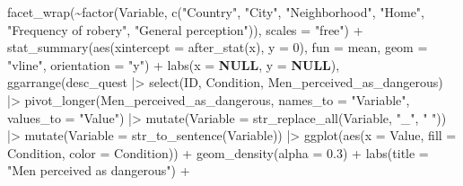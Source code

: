 \documentclass[
  bookmarksnumbered]{article}
\newenvironment{Shaded}{\begin{snugshade}}{\end{snugshade}}
\newcommand{\AttributeTok}[1]{\textcolor[rgb]{0.80,0.80,0.80}{#1}}
\newcommand{\ConstantTok}[1]{\textcolor[rgb]{0.86,0.64,0.64}{\textbf{#1}}}
\newcommand{\DecValTok}[1]{\textcolor[rgb]{0.86,0.86,0.80}{#1}}
\newcommand{\FloatTok}[1]{\textcolor[rgb]{0.75,0.75,0.82}{#1}}
\newcommand{\FunctionTok}[1]{\textcolor[rgb]{0.94,0.94,0.56}{#1}}
\newcommand{\NormalTok}[1]{\textcolor[rgb]{0.80,0.80,0.80}{#1}}
\newcommand{\SpecialCharTok}[1]{\textcolor[rgb]{0.86,0.64,0.64}{#1}}
\newcommand{\StringTok}[1]{\textcolor[rgb]{0.80,0.58,0.58}{#1}}
\begin{document}
\begin{Shaded}
\begin{Highlighting}[]
            \FunctionTok{facet\_wrap}\NormalTok{(}\SpecialCharTok{\textasciitilde{}}\FunctionTok{factor}\NormalTok{(Variable, }\FunctionTok{c}\NormalTok{(}\StringTok{"Country"}\NormalTok{, }\StringTok{"City"}\NormalTok{, }\StringTok{"Neighborhood"}\NormalTok{, }\StringTok{"Home"}\NormalTok{,}
                                           \StringTok{"Frequency of robery"}\NormalTok{, }\StringTok{"General perception"}\NormalTok{)),}
                               \AttributeTok{scales =} \StringTok{"free"}\NormalTok{) }\SpecialCharTok{+}
            \FunctionTok{stat\_summary}\NormalTok{(}\FunctionTok{aes}\NormalTok{(}\AttributeTok{xintercept =} \FunctionTok{after\_stat}\NormalTok{(x), }\AttributeTok{y =} \DecValTok{0}\NormalTok{),}
                         \AttributeTok{fun =}\NormalTok{ mean, }\AttributeTok{geom =} \StringTok{"vline"}\NormalTok{, }\AttributeTok{orientation =} \StringTok{"y"}\NormalTok{) }\SpecialCharTok{+}
            \FunctionTok{labs}\NormalTok{(}\AttributeTok{x =} \ConstantTok{NULL}\NormalTok{, }\AttributeTok{y =} \ConstantTok{NULL}\NormalTok{),}
          \FunctionTok{ggarrange}\NormalTok{(desc\_quest }\SpecialCharTok{|\textgreater{}}
                      \FunctionTok{select}\NormalTok{(ID, Condition, }
\NormalTok{                             Men\_perceived\_as\_dangerous) }\SpecialCharTok{|\textgreater{}} 
                      \FunctionTok{pivot\_longer}\NormalTok{(Men\_perceived\_as\_dangerous,}
                                   \AttributeTok{names\_to =} \StringTok{"Variable"}\NormalTok{,}
                                   \AttributeTok{values\_to =} \StringTok{"Value"}\NormalTok{) }\SpecialCharTok{|\textgreater{}} 
                      \FunctionTok{mutate}\NormalTok{(}\AttributeTok{Variable =} \FunctionTok{str\_replace\_all}\NormalTok{(Variable, }
                                                        \StringTok{"\_"}\NormalTok{, }\StringTok{" "}\NormalTok{)) }\SpecialCharTok{|\textgreater{}} 
                      \FunctionTok{mutate}\NormalTok{(}\AttributeTok{Variable =} \FunctionTok{str\_to\_sentence}\NormalTok{(Variable)) }\SpecialCharTok{|\textgreater{}} 
                      \FunctionTok{ggplot}\NormalTok{(}\FunctionTok{aes}\NormalTok{(}\AttributeTok{x =}\NormalTok{ Value, }\AttributeTok{fill =}\NormalTok{ Condition, }\AttributeTok{color =}\NormalTok{ Condition)) }\SpecialCharTok{+}
                      \FunctionTok{geom\_density}\NormalTok{(}\AttributeTok{alpha =} \FloatTok{0.3}\NormalTok{) }\SpecialCharTok{+}
                      \FunctionTok{labs}\NormalTok{(}\AttributeTok{title =} \StringTok{"Men perceived as dangerous"}\NormalTok{) }\SpecialCharTok{+}

\end{Highlighting}
\end{Shaded}
\end{document}

